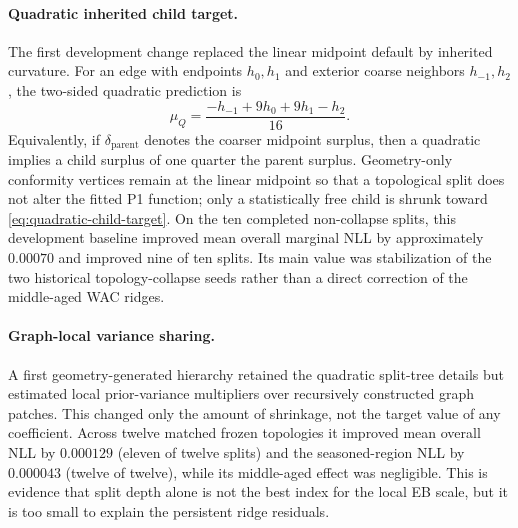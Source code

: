 \documentclass[11pt]{article}
\begin{document}
\paragraph{Quadratic inherited child target.}
The first development change replaced the linear midpoint default by inherited curvature. For an
edge with endpoints $h_0,h_1$ and exterior coarse neighbors $h_{-1},h_2$, the two-sided quadratic
prediction is
\begin{equation}\label{eq:quadratic-child-target}
 \mu_{Q}=\frac{-h_{-1}+9h_0+9h_1-h_2}{16}.
\end{equation}
Equivalently, if $\delta_{\mathrm{parent}}$ denotes the coarser midpoint surplus, then a quadratic
implies a child surplus of one quarter the parent surplus. Geometry-only conformity vertices remain
at the linear midpoint so that a topological split does not alter the fitted P1 function; only a
statistically free child is shrunk toward \eqref{eq:quadratic-child-target}. On the ten completed
non-collapse splits, this development baseline improved mean overall marginal NLL by approximately
$0.00070$ and improved nine of ten splits. Its main value was stabilization of the two historical
topology-collapse seeds rather than a direct correction of the middle-aged WAC ridges.

\paragraph{Graph-local variance sharing.}
A first geometry-generated hierarchy retained the quadratic split-tree details but estimated local
prior-variance multipliers over recursively constructed graph patches. This changed only the amount
of shrinkage, not the target value of any coefficient. Across twelve matched frozen topologies it
improved mean overall NLL by $0.000129$ (eleven of twelve splits) and the seasoned-region NLL by
$0.000043$ (twelve of twelve), while its middle-aged effect was negligible. This is evidence that
split depth alone is not the best index for the local EB scale, but it is too small to explain the
persistent ridge residuals.
\end{document}
